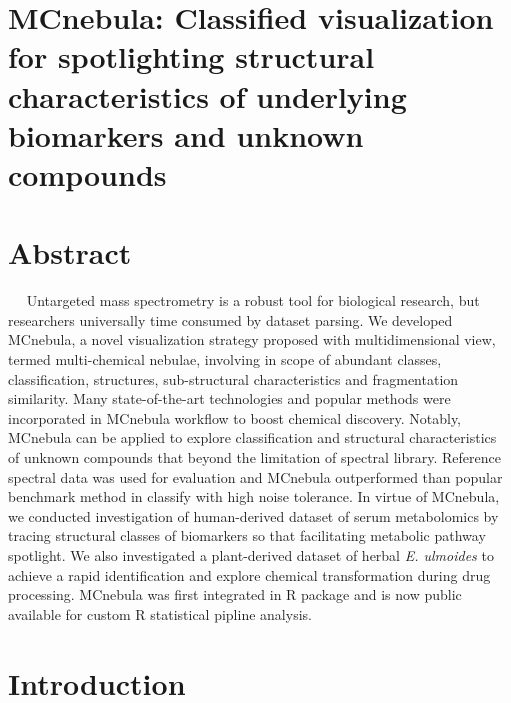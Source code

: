\hypertarget{mcnebula-classified-visualization-for-spotlighting-structural-characteristics-of-underlying-biomarkers-and-unknown-compounds}{%
\section{\texorpdfstring{\textbf{MCnebula: Classified visualization for
spotlighting structural characteristics of underlying biomarkers and
unknown
compounds}}{MCnebula: Classified visualization for spotlighting structural characteristics of underlying biomarkers and unknown compounds}}\label{mcnebula-classified-visualization-for-spotlighting-structural-characteristics-of-underlying-biomarkers-and-unknown-compounds}}

\hypertarget{abstract}{%
\section{\texorpdfstring{\textbf{Abstract}}{Abstract}}\label{abstract}}

   Untargeted mass spectrometry is a robust tool for biological
research, but researchers universally time consumed by dataset parsing.
We developed MCnebula, a novel visualization strategy proposed with
multidimensional view, termed multi-chemical nebulae, involving in scope
of abundant classes, classification, structures, sub-structural
characteristics and fragmentation similarity. Many state-of-the-art
technologies and popular methods were incorporated in MCnebula workflow
to boost chemical discovery. Notably, MCnebula can be applied to explore
classification and structural characteristics of unknown compounds that
beyond the limitation of spectral library. Reference spectral data was
used for evaluation and MCnebula outperformed than popular benchmark
method in classify with high noise tolerance. In virtue of MCnebula, we
conducted investigation of human-derived dataset of serum metabolomics
by tracing structural classes of biomarkers so that facilitating
metabolic pathway spotlight. We also investigated a plant-derived
dataset of herbal \emph{E. ulmoides} to achieve a rapid identification
and explore chemical transformation during drug processing. MCnebula was
first integrated in R package and is now public available for custom R
statistical pipline analysis.

\hypertarget{introduction}{%
\section{\texorpdfstring{\textbf{Introduction}}{Introduction}}\label{introduction}}

